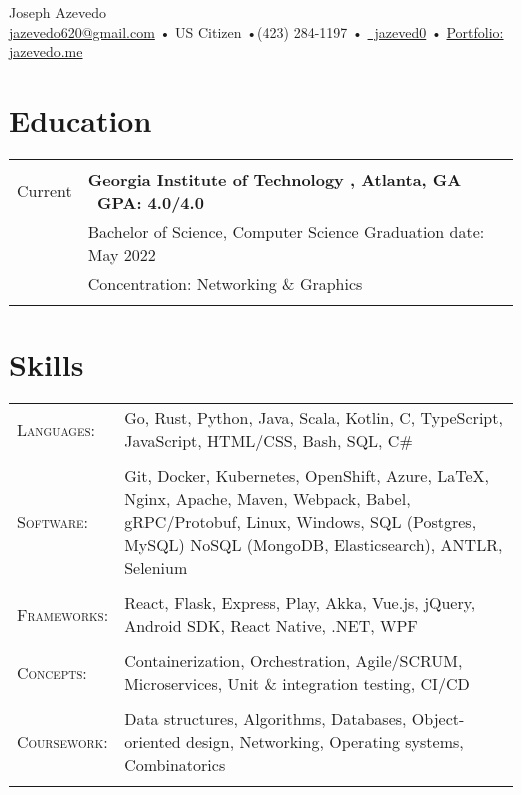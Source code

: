 \documentclass[a4paper,11pt]{article}
\newcommand{\lcolwidth}{2.2cm}
\newcommand{\lcolwidthinner}{2.1cm}
\newcommand{\rcolwidth}{16.2cm}
\newenvironment{rsection}[1]
  {
    \section{#1}
    \begin{tabular}{>{\raggedleft\arraybackslash}p{\lcolwidth}|p{\rcolwidth}}
   } {
    \\\multicolumn{2}{c}{} \\[-10pt]
    \end{tabular}
  }
\newcommand{\rheader}[2]{
    \multirow[t]{2}{*}{
        \begin{minipage}[t]{\lcolwidthinner}
            \begin{flushright}
                \textsc{#1}
            \end{flushright}
        \end{minipage}
    } & \textbf{#2}
}
\newcommand{\rline}[1]{\\& #1}
\newcommand{\ritem}[2][ •\hspace{3pt}]{\\[-2pt]& \footnotesize{#1#2}}
\newenvironment{rskills}[1][Skills]
  {
    \section{#1}
    \begin{tabular}{>{\raggedleft\arraybackslash}p{\lcolwidth}p{\rcolwidth}}
    } {
    \end{tabular}
  }
\newcommand{\rskill}[2]{\textsc{#1}:& \small #2 \\ & \\[-14pt]}
\newcommand{\rdot}{\xspace\hspace{0pt}•\hspace{3pt}\xspace}
\begin{document}
\hsize=7.5in \vsize=11in
\hoffset=-0.65in \voffset=-0.5in
\pdfpagewidth=8.5in
\pdfpageheight=11in
\pagestyle{empty}

\newcommand{\at}{@}
\newcommand{\gmaildotcom}{gmail.com}

\begin{center}
     \Huge       Joseph Azevedo
  \\[2pt] \normalsize \href{mailto:jazevedo620\at\gmaildotcom}{jazevedo620\at\gmaildotcom}
    \rdot US Citizen \rdot (423) 284-1197 \rdot
\href{https://github.com/jazeved0}{\faGithub\ jazeved0} \rdot
    \href{https://jazevedo.me}{Portfolio: jazevedo.me} \\[6pt]
\end{center}
\vspace{11pt}


\begin{rsection}{Education}
  \rheader{Jun 2018 -\\[-1pt] Current}{Georgia Institute of Technology
    {\normalfont, Atlanta, GA \hfill\  GPA: 4.0/4.0\ }}
  \rline{Bachelor of Science, Computer Science \hfill Graduation date: May 2022}
  \vspace{2pt}
  \ritem[]{Concentration: Networking \& Graphics}
\end{rsection}
\vspace{-4pt}


\begin{rskills}
  \rskill{Languages}  {Go, Rust, Python, Java, Scala, Kotlin, C, TypeScript,
                      JavaScript, HTML/CSS, Bash, SQL, C\#}
  \rskill{Software}   {Git, Docker, Kubernetes, OpenShift, Azure, \LaTeX,
                      Nginx, Apache, Maven, Webpack, Babel,
                      gRPC/Protobuf, Linux, Windows, SQL (Postgres, MySQL)
                      NoSQL (MongoDB, Elasticsearch), ANTLR, Selenium}
  \rskill{Frameworks} {React, Flask, Express, Play, Akka, Vue.js, jQuery,
                      Android SDK, React Native, .NET, WPF}
  \rskill{Concepts}   {Containerization, Orchestration, Agile/SCRUM, Microservices,
                      Unit \& integration testing, CI/CD}
  \rskill{Coursework} {Data structures, Algorithms, Databases, Object-oriented design,
                      Networking, Operating systems, Combinatorics}
\end{rskills}
\vspace{7pt}
\end{document}
